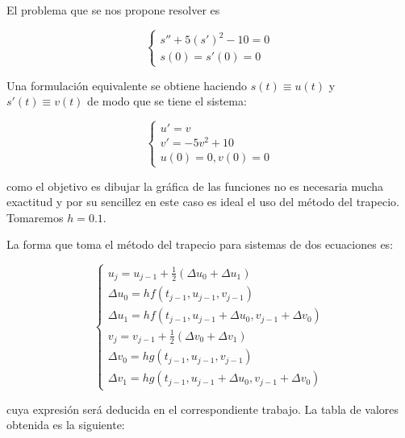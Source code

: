 \documentclass{article}
\theoremstyle{theorem-style}  %
\theoremstyle{definition-style}
\theoremstyle{example-style}
\begin{document}
El problema que se nos propone resolver es

	\begin{equation*}
		\begin{cases}
			s''+5(s')^2-10=0 \\
			s(0)=s'(0)=0
		\end{cases}
	\end{equation*}

Una formulación equivalente se obtiene haciendo $s(t) \equiv u(t)$ y $s'(t) \equiv v(t)$ de modo que se tiene el sistema:

	\begin{equation*}
		\begin{cases}
			u'=v \\
			v'=-5v^2+10 \\
			u(0)=0,v(0)=0
		\end{cases}
	\end{equation*}

como el objetivo es dibujar la gráfica de las funciones no es necesaria mucha exactitud y por su sencillez en este caso es ideal el uso del método del trapecio. Tomaremos $h = 0.1$.

La forma que toma el método del trapecio para sistemas de dos ecuaciones es:

	\begin{equation*}
		\begin{cases}
			u_j=u_{j-1}+\frac{1}{2}(\Delta u_0+\Delta u_1) \\
			\Delta u_0 = hf(t_{j-1},u_{j-1},v_{j-1}) \\
			\Delta u_1 = hf(t_{j-1},u_{j-1}+\Delta u_0,v_{j-1}+\Delta v_0) \\
			v_j=v_{j-1}+\frac{1}{2}(\Delta v_0+\Delta v_1) \\
			\Delta v_0 = hg(t_{j-1},u_{j-1},v_{j-1}) \\
			\Delta v_1 = hg(t_{j-1},u_{j-1}+\Delta u_0,v_{j-1}+\Delta v_0)
		\end{cases}
	\end{equation*}

cuya expresión será deducida en el correspondiente trabajo. La tabla de valores obtenida es la siguiente:
\end{document}
